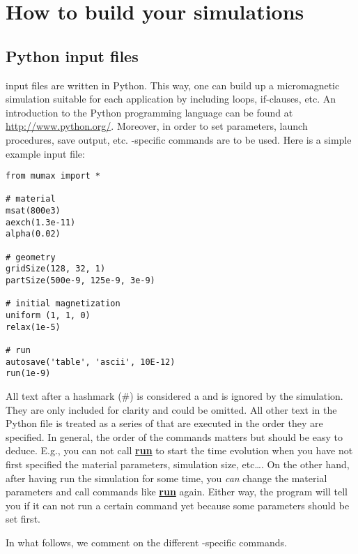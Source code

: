 \section{How to build your simulations}

\newcommand{\command}[1]{\hyperref[#1]{\textbf{#1}}\index{#1}\label{#1}}

\subsection{Python input files}
\mumax input files are written in Python. This way, one can build up a micromagnetic simulation suitable for each application by including loops, if-clauses, etc.  An introduction to the Python programming language can be found at \url{http://www.python.org/}.  Moreover, in order to set parameters, launch procedures, save output, etc. \mumax-specific commands are to be used.  Here is a simple example input file: 

\begin{verbatim}
from mumax import *

# material
msat(800e3)
aexch(1.3e-11)
alpha(0.02)

# geometry 
gridSize(128, 32, 1)
partSize(500e-9, 125e-9, 3e-9)

# initial magnetization
uniform	(1, 1, 0)
relax(1e-5)

# run
autosave('table', 'ascii', 10E-12)
run(1e-9)
\end{verbatim}                                                                                                                                            

All text after a hashmark (\#) is considered a  and is ignored by the simulation.  They are only included for clarity and could be omitted.  All other text in the Python file is treated as a series of  that are executed in the order they are specified. In general, the order of the commands matters but should be easy to deduce.  E.g., you can not call \command{run} to start the time evolution when you have not first specified the material parameters, simulation size, etc\ldots. On the other hand, after having {run} the simulation for some time, you \emph{can} change the material parameters and call commands like \command{run} again. Either way, the program will tell you if it can not run a certain command yet because some parameters should be set first.

In what follows, we comment on the different \mumax-specific commands.

